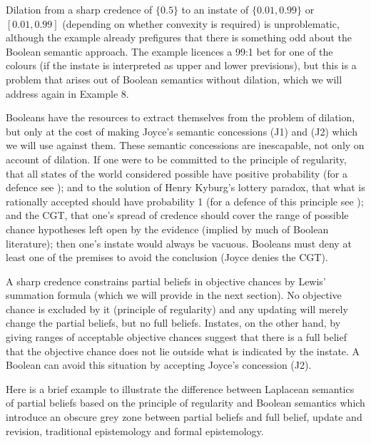 \documentclass[11pt]{article}
\begin{document}
Dilation from a sharp credence of $\{0.5\}$ to an instate of
$\{0.01,0.99\}$ or $[0.01,0.99]$ (depending on whether convexity is
required) is unproblematic, although the example already prefigures
that there is something odd about the Boolean semantic approach. The
example licences a 99:1 bet for one of the colours (if the instate is
interpreted as upper and lower previsions), but this is a problem that
arises out of Boolean semantics without dilation, which we will
address again in Example 8.

Booleans have the resources to extract themselves from the problem of
dilation, but only at the cost of making Joyce's semantic concessions
(J1) and (J2) which we will use against them. These semantic
concessions are inescapable, not only on account of dilation. If one
were to be committed to the principle of regularity, that all states
of the world considered possible have positive probability (for a
defence see ); and to the solution of Henry
Kyburg's lottery paradox, that what is rationally accepted should have
probability 1 (for a defence of this principle see
); and the CGT, that one's spread of
credence should cover the range of possible chance hypotheses left
open by the evidence (implied by much of Boolean literature); then
one's instate would always be vacuous. Booleans must deny at least one
of the premises to avoid the conclusion (Joyce denies the CGT).

A sharp credence constrains partial beliefs in objective chances by
Lewis' summation formula (which we will provide in the next section).
No objective chance is excluded by it (principle of regularity) and
any updating will merely change the partial beliefs, but no full
beliefs. Instates, on the other hand, by giving ranges of acceptable
objective chances suggest that there is a full belief that the
objective chance does not lie outside what is indicated by the
instate. A Boolean can avoid this situation by accepting Joyce's
concession (J2).

Here is a brief example to illustrate the difference between Laplacean
semantics of partial beliefs based on the principle of regularity and
Boolean semantics which introduce an obscure grey zone between partial
beliefs and full belief, update and revision, traditional epistemology
and formal epistemology.

\end{document}
